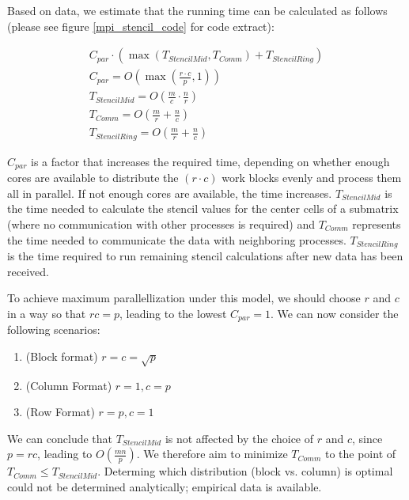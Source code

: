 \documentclass[11pt]{article}
\begin{document}
Based on data, we estimate that the running time can be calculated as follows (please see figure \ref{mpi_stencil_code} for code extract):

\begin{eqnarray}
C_{par} \cdot \left( \max(T_{StencilMid}, T_{Comm}) + T_{StencilRing} \right)\\
C_{par} = O\left(\max(\frac{r\cdot c}{p}, 1)\right)\\
T_{StencilMid} = O\left(\frac{m}{c} \cdot \frac{n}{r}\right)\\
T_{Comm} = O\left(\frac{m}{r} + \frac{n}{c}\right)\\
T_{StencilRing} = O\left(\frac{m}{r} + \frac{n}{c}\right)
\end{eqnarray}

$C_{par}$ is a factor that increases the required time, depending on whether enough cores are available to distribute the $(r \cdot c)$ work blocks evenly and process them all in parallel. If not enough cores are available, the time increases. $T_{StencilMid}$ is the time needed to calculate the stencil values for the center cells of a submatrix (where no communication with other processes is required) and $T_{Comm}$ represents the time needed to communicate the data with neighboring processes. $T_{StencilRing}$ is the time required to run remaining stencil calculations after new data has been received.

To achieve maximum parallellization under this model, we should choose $r$ and $c$ in a way so that $rc = p$, leading to the lowest $C_{par} = 1$. We can now consider the following scenarios:

\begin{enumerate}
\item (Block format) $r = c = \sqrt{p}$ 
\item (Column Format) $r = 1, c = p$
\item (Row Format) $r = p, c = 1$
\end{enumerate}

We can conclude that $T_{StencilMid}$ is not affected by the choice of $r$ and $c$, since $p = rc$, leading to $O(\frac{mn}{p})$. We therefore aim to minimize $T_{Comm}$ to the point of $T_{Comm} \leq T_{StencilMid}$. Determing which distribution (block vs. column) is optimal could not be determined analytically; empirical data is available.
\end{document}
